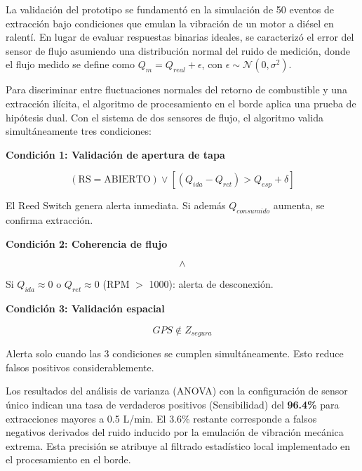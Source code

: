 \documentclass[twocolumn, 10pt]{article}
\begin{document}
La validación del prototipo se fundamentó en la simulación de 50 eventos de extracción bajo condiciones que emulan la vibración de un motor a diésel en ralentí. En lugar de evaluar respuestas binarias ideales, se caracterizó el error del sensor de flujo asumiendo una distribución normal del ruido de medición, donde el flujo medido se define como $Q_{m} = Q_{real} + \epsilon$, con $\epsilon \sim \mathcal{N}(0, \sigma^2)$.

Para discriminar entre fluctuaciones normales del retorno de combustible y una extracción ilícita, el algoritmo de procesamiento en el borde aplica una prueba de hipótesis dual. Con el sistema de dos sensores de flujo, el algoritmo valida simultáneamente tres condiciones:

\textbf{Condición 1: Validación de apertura de tapa}

{\small
\begin{equation*}
  (\text{RS} = \text{ABIERTO}) \vee [(Q_{ida} - Q_{ret}) > Q_{esp} + \delta]
\end{equation*}
}

El Reed Switch genera alerta inmediata. Si además $Q_{consumido}$ aumenta, se confirma extracción.

\textbf{Condición 2: Coherencia de flujo}

{\small
\begin{equation*}
  [|Q_{ida} - Q_{ret} - Q_{esp(RPM)}| < \epsilon] \wedge
\end{equation*}
\begin{equation*}
  [(Q_{ida} > 0.1) \wedge (Q_{ret} > 0.1)]
\end{equation*}
}

Si $Q_{ida} \approx 0$ o $Q_{ret} \approx 0$ (RPM $>$ 1000): alerta de desconexión.

\textbf{Condición 3: Validación espacial}

{\small
\begin{equation*}
  GPS \notin Z_{segura}
\end{equation*}
}

Alerta solo cuando las 3 condiciones se cumplen simultáneamente. Esto reduce falsos positivos considerablemente.

Los resultados del análisis de varianza (ANOVA) con la configuración de sensor único indican una tasa de verdaderos positivos (Sensibilidad) del \textbf{96.4\%} para extracciones mayores a 0.5 L/min. El 3.6\% restante corresponde a falsos negativos derivados del ruido inducido por la emulación de vibración mecánica extrema. Esta precisión se atribuye al filtrado estadístico local implementado en el procesamiento en el borde.
\end{document}
